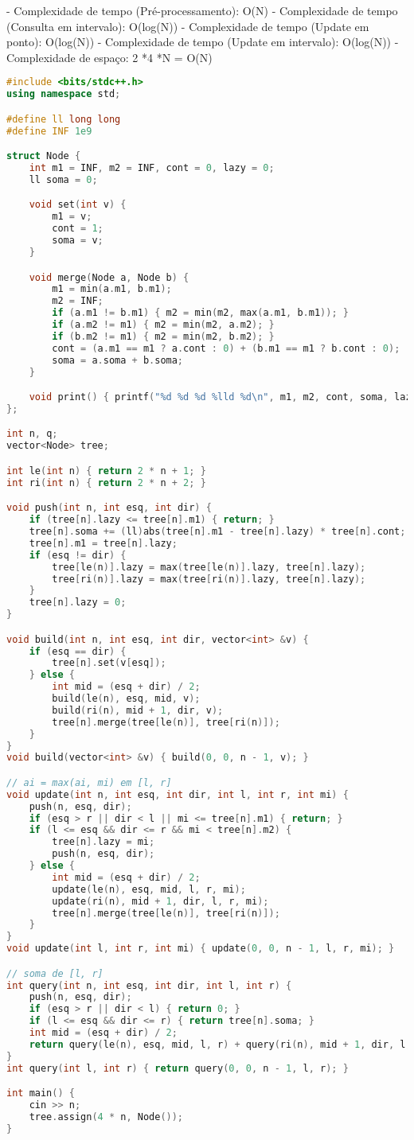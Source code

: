 \documentclass[11pt, a4paper, twoside]{article}
\begin{document}
- Complexidade de tempo (Pré-processamento): O(N)
- Complexidade de tempo (Consulta em intervalo): O(log(N))
- Complexidade de tempo (Update em ponto): O(log(N))
- Complexidade de tempo (Update em intervalo): O(log(N))
- Complexidade de espaço: 2 *4 *N = O(N)

\begin{lstlisting}[language=C++]
#include <bits/stdc++.h>
using namespace std;

#define ll long long
#define INF 1e9

struct Node {
    int m1 = INF, m2 = INF, cont = 0, lazy = 0;
    ll soma = 0;

    void set(int v) {
        m1 = v;
        cont = 1;
        soma = v;
    }

    void merge(Node a, Node b) {
        m1 = min(a.m1, b.m1);
        m2 = INF;
        if (a.m1 != b.m1) { m2 = min(m2, max(a.m1, b.m1)); }
        if (a.m2 != m1) { m2 = min(m2, a.m2); }
        if (b.m2 != m1) { m2 = min(m2, b.m2); }
        cont = (a.m1 == m1 ? a.cont : 0) + (b.m1 == m1 ? b.cont : 0);
        soma = a.soma + b.soma;
    }

    void print() { printf("%d %d %d %lld %d\n", m1, m2, cont, soma, lazy); }
};

int n, q;
vector<Node> tree;

int le(int n) { return 2 * n + 1; }
int ri(int n) { return 2 * n + 2; }

void push(int n, int esq, int dir) {
    if (tree[n].lazy <= tree[n].m1) { return; }
    tree[n].soma += (ll)abs(tree[n].m1 - tree[n].lazy) * tree[n].cont;
    tree[n].m1 = tree[n].lazy;
    if (esq != dir) {
        tree[le(n)].lazy = max(tree[le(n)].lazy, tree[n].lazy);
        tree[ri(n)].lazy = max(tree[ri(n)].lazy, tree[n].lazy);
    }
    tree[n].lazy = 0;
}

void build(int n, int esq, int dir, vector<int> &v) {
    if (esq == dir) {
        tree[n].set(v[esq]);
    } else {
        int mid = (esq + dir) / 2;
        build(le(n), esq, mid, v);
        build(ri(n), mid + 1, dir, v);
        tree[n].merge(tree[le(n)], tree[ri(n)]);
    }
}
void build(vector<int> &v) { build(0, 0, n - 1, v); }

// ai = max(ai, mi) em [l, r]
void update(int n, int esq, int dir, int l, int r, int mi) {
    push(n, esq, dir);
    if (esq > r || dir < l || mi <= tree[n].m1) { return; }
    if (l <= esq && dir <= r && mi < tree[n].m2) {
        tree[n].lazy = mi;
        push(n, esq, dir);
    } else {
        int mid = (esq + dir) / 2;
        update(le(n), esq, mid, l, r, mi);
        update(ri(n), mid + 1, dir, l, r, mi);
        tree[n].merge(tree[le(n)], tree[ri(n)]);
    }
}
void update(int l, int r, int mi) { update(0, 0, n - 1, l, r, mi); }

// soma de [l, r]
int query(int n, int esq, int dir, int l, int r) {
    push(n, esq, dir);
    if (esq > r || dir < l) { return 0; }
    if (l <= esq && dir <= r) { return tree[n].soma; }
    int mid = (esq + dir) / 2;
    return query(le(n), esq, mid, l, r) + query(ri(n), mid + 1, dir, l, r);
}
int query(int l, int r) { return query(0, 0, n - 1, l, r); }

int main() {
    cin >> n;
    tree.assign(4 * n, Node());
}
\end{lstlisting}
\end{document}
